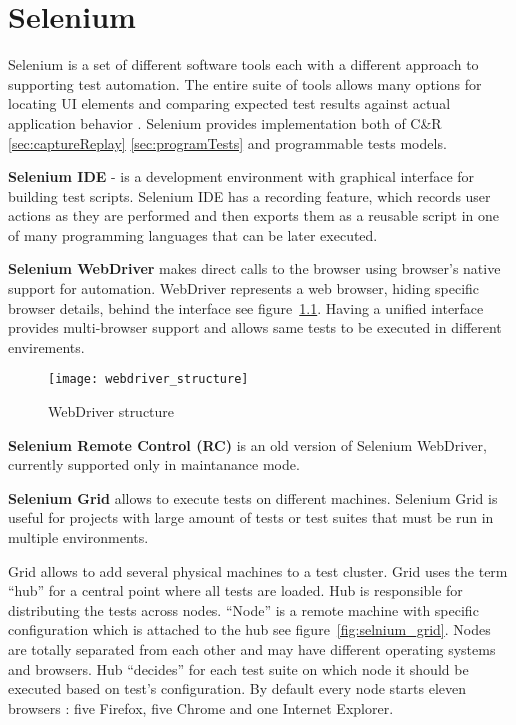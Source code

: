 	\chapter {Selenium}
	\label{ch:selenium}
      Selenium is a set of different software tools each with a different approach
       to supporting test automation. The entire suite of tools allows many
       options for locating UI elements and comparing expected test results
       against actual application behavior \cite{seleniumSite}.
       Selenium provides implementation both of C\&R \ref{sec:captureReplay}
       \ref{sec:programTests} and programmable tests models.  
       
       \textbf{Selenium IDE} - is a development environment with graphical
       interface for building test scripts.
		Selenium IDE has a recording feature,  which records user actions as they are
		performed and then exports them as a reusable script in one of many programming languages that can be later executed.
       
       \textbf{Selenium  WebDriver} makes direct calls to the browser using browser's native support for automation. WebDriver represents a web browser, hiding specific browser details, behind the interface see
       figure~\ref{fig:webdriver}. Having a unified interface provides
       multi-browser support and allows same tests to be executed in different
       envirements.
       
	    \begin{figure}
		\label{fig:webdriver}
		\texttt{[image: webdriver\_structure]}
		\caption{WebDriver structure}
		\end{figure}
		
    	\textbf{Selenium Remote Control (RC)} is an old version of Selenium
    	WebDriver, currently supported only in maintanance mode.
       
       \textbf{Selenium Grid} allows to execute tests on different machines.
       Selenium Grid is useful for projects with large amount of tests or test
       suites that must be run in multiple environments.
       
		Grid allows to add several physical machines to a test cluster. Grid uses the
		term ``hub'' for a central point where all tests are loaded. Hub is responsible
		for distributing the tests across nodes. ``Node'' is  a remote machine with
		specific configuration which is attached to the hub see
		figure~\ref{fig:selnium_grid}. Nodes are totally separated from each other and
		may have different operating systems and browsers. Hub ``decides''
		for each test suite on which node it should be executed based on test's configuration.
		By default every node starts eleven browsers : five Firefox, five Chrome and
		one Internet Explorer.
		
